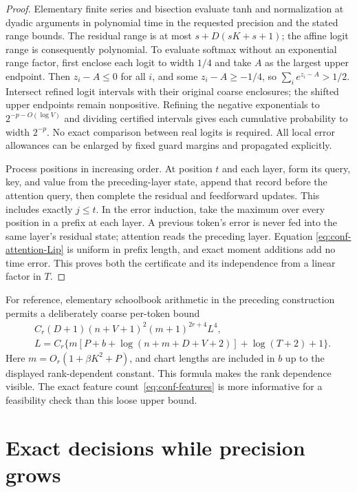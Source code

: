 \documentclass[11pt]{article}
\theoremstyle{definition}\newtheorem{definition}[theorem]{Definition}
\theoremstyle{remark}\newtheorem{remark}[theorem]{Remark}
\numberwithin{equation}{section}
\begin{document}
\begin{proof}
Elementary finite series and bisection evaluate tanh and normalization
at dyadic arguments in polynomial time in the requested precision and
the stated range bounds. The residual range is at most
$s+D(sK+s+1)$; the affine logit range is consequently polynomial.
To evaluate softmax without an exponential range factor, first enclose
each logit to width $1/4$ and take $A$ as the largest upper endpoint.
Then $z_i-A\le0$ for all $i$, and some $z_i-A\ge-1/4$, so
$\sum_i e^{z_i-A}>1/2$. Intersect refined logit intervals with their original coarse enclosures;
the shifted upper endpoints remain nonpositive. Refining the negative
exponentials to $2^{-p-O(\log V)}$ and dividing certified intervals gives each cumulative
probability to width $2^{-p}$. No exact comparison between real logits
is required. All local error allowances can be enlarged by fixed guard
margins and propagated explicitly.

Process positions in increasing order. At position $t$ and each layer,
form its query, key, and value from the preceding-layer state, append
that record before the attention query, then complete the residual and
feedforward updates. This includes exactly $j\le t$. In the error
induction, take the maximum over every position in a prefix at each
layer. A previous token's error is never fed into the same layer's
residual state; attention reads the preceding layer. Equation
\eqref{eq:conf-attention-Lip} is uniform in prefix length, and exact
moment additions add no time error. This proves both the certificate
and its independence from a linear factor in $T$.
\end{proof}

For reference, elementary schoolbook arithmetic in the preceding
construction permits a deliberately coarse per-token bound
\begin{equation}
 \begin{aligned}
 &C_r(D+1)(n+V+1)^2(m+1)^{2r+4}L^4,\\
 &L=C_r\{m[P+b+\log(n+m+D+V+2)]+\log(T+2)+1\}.
 \end{aligned}
 \label{eq:conf-explicit}
\end{equation}
Here $m=O_r(1+\beta K^2+P)$, and chart lengths are included in $b$
up to the displayed rank-dependent constant. This formula makes the
rank dependence visible. The exact feature count~\eqref{eq:conf-features}
is more informative for a feasibility check than this loose upper bound.

\section{Exact decisions while precision grows}
\label{sec:conf-replay}
\end{document}
